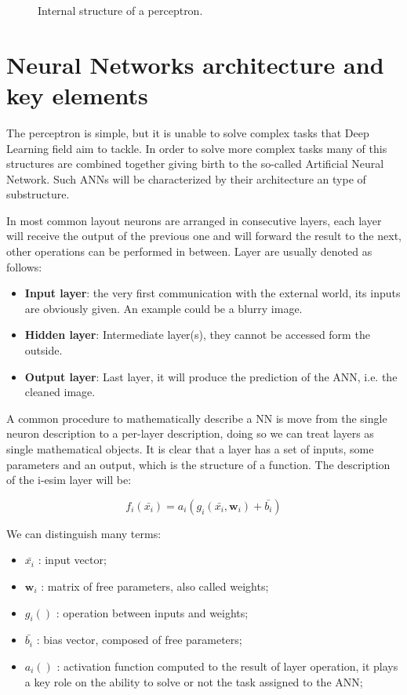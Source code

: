 \documentclass[../../main.tex]{subfiles}
\begin{document}
\begin{figure}[h]
    \centering

\caption{Internal structure of a perceptron.}
    \label{fig:perceptron}
\end{figure}
    
\section{Neural Networks architecture and key elements}
\label{sec:NN_arch}
The perceptron is simple, but it is unable to solve complex tasks that Deep Learning field aim to tackle. In order to solve more complex tasks many of this structures are combined together giving birth to the so-called Artificial Neural Network. Such ANNs will be characterized by their architecture an type of substructure.  

In most common layout neurons are arranged in consecutive layers, each layer will receive the output of the previous one and will forward the result to the next, other operations can be performed in between. Layer are usually denoted as follows:
\begin{itemize}
    \item \textbf{Input layer}: the very first communication with the external world, its inputs are obviously given. An example could be a blurry image. 
    \item \textbf{Hidden layer}: Intermediate layer(s), they cannot be accessed form the outside.
    \item \textbf{Output layer}: Last layer, it will produce the prediction of the ANN, i.e. the cleaned image. 
\end{itemize}


A common procedure to mathematically describe a NN is move from the single neuron description to a per-layer description, doing so we can treat layers as single mathematical objects.  
It is clear that a layer has a set of inputs, some parameters and an output, which is the structure of a function. The description of the i-esim layer will be:  

\begin{equation}
    f_i(\bar{x_i}) = a_i\left(g_i(\bar{x_i}, \textbf{w}_i) + \bar{b_i} \right)
\end{equation}

We can distinguish many terms:
\begin{itemize}
    \item $\bar{x_i}$ : input vector;
    \item $\textbf{w}_i$ : matrix of free parameters, also called weights;
    \item $g_i()$ : operation between inputs and weights;
    \item $\bar{b_i}$ : bias vector, composed of free parameters;
    \item $a_i()$ : activation function computed to the result of layer operation, it plays a key role on the ability to solve or not the task assigned to the ANN;
\end{itemize}
\end{document}
